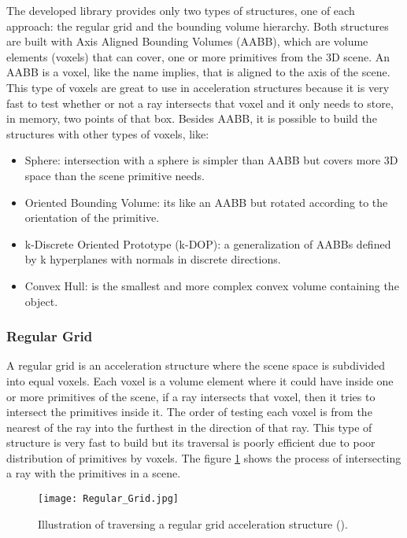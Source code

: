\par
The developed library provides only two types of structures, one of each approach: the regular grid and the bounding volume hierarchy.
Both structures are built with Axis Aligned Bounding Volumes (AABB), which are volume elements (voxels) that can cover, one or more primitives from the 3D scene.
An AABB is a voxel, like the name implies, that is aligned to the axis of the scene.
This type of voxels are great to use in acceleration structures because it is very fast to test whether or not a ray intersects that voxel and it only needs to store, in memory, two points of that box.
Besides AABB, it is possible to build the structures with other types of voxels, like:

\begin{itemize}
	\item Sphere: intersection with a sphere is simpler than AABB but covers more 3D space than the scene primitive needs.
	\item Oriented Bounding Volume: its like an AABB but rotated according to the orientation of the primitive.
	\item k-Discrete Oriented Prototype (k-DOP): a generalization of AABBs defined by k hyperplanes with normals in discrete directions.
	\item Convex Hull: is the smallest and more complex convex volume containing the object.
\end{itemize}

\subsubsection{Regular Grid}

\par
A regular grid is an acceleration structure where the scene space is subdivided into equal voxels.
Each voxel is a volume element where it could have inside one or more primitives of the scene, if a ray intersects that voxel, then it tries to intersect the primitives inside it.
The order of testing each voxel is from the nearest of the ray into the furthest in the direction of that ray.
This type of structure is very fast to build but its traversal is poorly efficient due to poor distribution of primitives by voxels.
The figure \ref{RegularGrid.} shows the process of intersecting a ray with the primitives in a scene.

\begin{figure}[H]
	\centering
	\caption{Illustration of traversing a regular grid acceleration structure (\cite{RegularGrid}).}
	\label{RegularGrid.}
	\texttt{[image: Regular\_Grid.jpg]}
\end{figure}

